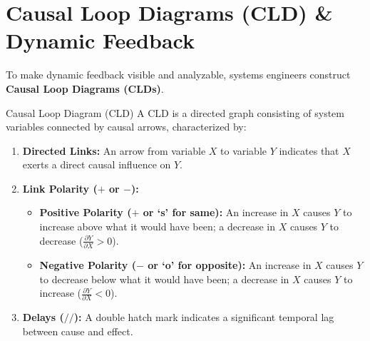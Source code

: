 \section{Causal Loop Diagrams (CLD) \& Dynamic Feedback}
\label{sec:cld_feedback}

To make dynamic feedback visible and analyzable, systems engineers construct \textbf{Causal Loop Diagrams (CLDs)}.

\begin{definitionbox}{Causal Loop Diagram (CLD)}
A CLD is a directed graph consisting of system variables connected by causal arrows, characterized by:
\begin{enumerate}[label=(\alph*), itemsep=2pt]
    \item \textbf{Directed Links:} An arrow from variable $X$ to variable $Y$ indicates that $X$ exerts a direct causal influence on $Y$.
    \item \textbf{Link Polarity ($+$ or $-$):}
    \begin{itemize}
        \item \textbf{Positive Polarity ($+$ or `s' for same):} An increase in $X$ causes $Y$ to increase above what it would have been; a decrease in $X$ causes $Y$ to decrease ($\frac{\partial Y}{\partial X} > 0$).
        \item \textbf{Negative Polarity ($-$ or `o' for opposite):} An increase in $X$ causes $Y$ to decrease below what it would have been; a decrease in $X$ causes $Y$ to increase ($\frac{\partial Y}{\partial X} < 0$).
    \end{itemize}
    \item \textbf{Delays ($//$):} A double hatch mark indicates a significant temporal lag between cause and effect.
\end{enumerate}
\end{definitionbox}

